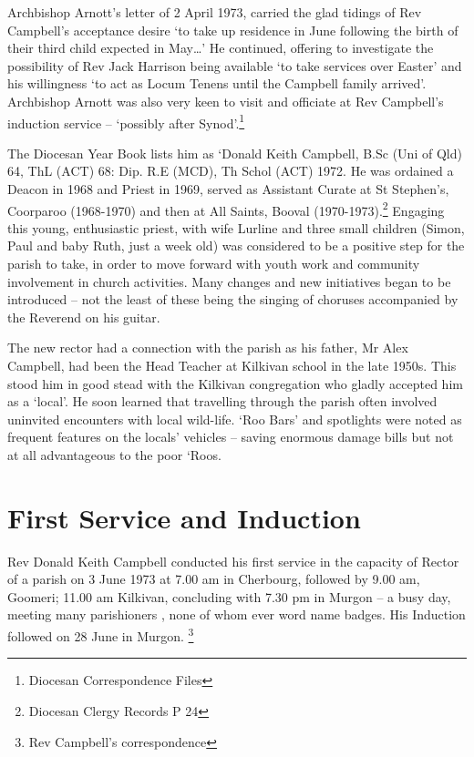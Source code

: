 Archbishop Arnott's letter of 2 April 1973, carried the glad tidings of Rev Campbell's acceptance desire `to take up residence in June following the birth of their third child expected in May\ldots' He continued, offering to investigate the possibility of Rev Jack Harrison being available `to take services over Easter' and his willingness `to act as Locum Tenens until the Campbell family arrived'. Archbishop Arnott was also very keen to visit and officiate at Rev Campbell's induction service -- `possibly after Synod'.\footnote{Diocesan Correspondence Files}

The Diocesan Year Book lists him as `Donald Keith Campbell, B.Sc (Uni of Qld) 64, ThL (ACT) 68: Dip. R.E (MCD), Th Schol (ACT) 1972. He was ordained a Deacon in 1968 and Priest in 1969, served as Assistant Curate at St Stephen's, Coorparoo (1968-1970) and then at All Saints, Booval (1970-1973).\footnote{Diocesan Clergy Records P 24} Engaging this young, enthusiastic priest, with wife Lurline and three small children (Simon, Paul and baby Ruth, just a week old) was considered to be a positive step for the parish to take, in order to move forward with youth work and community involvement in church activities. Many changes and new initiatives began to be introduced -- not the least of these being the singing of choruses accompanied by the Reverend on his guitar.

The new rector had a connection with the parish as his father, Mr Alex Campbell, had been the Head Teacher at Kilkivan school in the late 1950s. This stood him in good stead with the Kilkivan congregation who gladly accepted him as a `local'. He soon learned that travelling through the parish often involved uninvited encounters with local wild-life. `Roo Bars' and spotlights were noted as frequent features on the locals' vehicles -- saving enormous damage bills but not at all advantageous to the poor `Roos.

\hypertarget{first-service-and-induction}{%
\section{First Service and Induction}\label{first-service-and-induction}}

Rev Donald Keith Campbell conducted his first service in the capacity of Rector of a parish on 3 June 1973 at 7.00 am in Cherbourg, followed by 9.00 am, Goomeri; 11.00 am Kilkivan, concluding with 7.30 pm in Murgon -- a busy day, meeting many parishioners , none of whom ever word name badges. His Induction followed on 28 June in Murgon. \footnote{Rev Campbell's correspondence}

